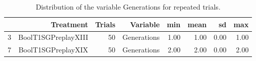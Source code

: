 \begin{table}[ht]
\centering
\begin{tabular}{rrrrrrrr}
  \hline
 & Treatment & Trials & Variable & min & mean & sd & max \\ 
  \hline
3 & BoolT1SGPreplayXIII &  50 & Generations & 1.00 & 1.00 & 0.00 & 1.00 \\ 
  7 & BoolT1SGPreplayXIX &  50 & Generations & 2.00 & 2.00 & 0.00 & 2.00 \\ 
   \hline
\end{tabular}
\caption{Distribution of the variable Generations for repeated trials.} 
\end{table}
